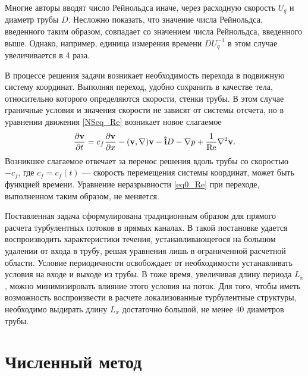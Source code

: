 Многие авторы вводят число Рейнольдса иначе, через расходную скорость $U_q$ и диаметр трубы $D$. Несложно показать, что значение числа Рейнольдса, введенного таким образом, совпадает со значением числа Рейнольдса, введенного выше. Однако, например, единица измерения времени $DU_q^{-1}$ в этом случае увеличивается в 4 раза.

В процессе решения задачи возникает необходимость перехода в подвижную систему координат. Выполняя переход, удобно сохранить в качестве тела, относительно которого определяются скорости, стенки трубы. В этом случае граничные условия и значения скорости не зависят от системы отсчета, но в уравнении движения \eqref{NSeq_Re} возникает новое слагаемое
\begin{equation}\label{NSeq_cf}
\frac{\partial \mathbf{v}}{\partial t} = c_f \frac{\partial \mathbf{v}}{\partial x} - (\mathbf{v}, \nabla) \mathbf{v} - \mathbf{\hat{i}} D - \nabla p + \frac{1}{\operatorname{Re}} \nabla^2 \mathbf{v}. 
\end{equation}
Возникшее слагаемое отвечает за перенос решения вдоль трубы со скоростью $-c_f$, где $c_f = c_f(t)$ --- скорость перемещения системы координат, может быть функцией времени. Уравнение неразрывности \eqref{eq0_Re} при переходе, выполненном таким образом, не меняется. 


Поставленная задача сформулирована традиционным образом для прямого расчета турбулентных потоков в прямых каналах. В такой постановке удается воспроизводить характеристики течения, устанавливающегося на большом удалении от входа в трубу, решая уравнения лишь в ограниченной расчетной области. Условие периодичности освобождает от необходимости устанавливать условия на входе и выходе из трубы. В тоже время, увеличивая длину периода $L_x$, можно минимизировать влияние этого условия на поток. Для того, чтобы иметь возможность воспроизвести в расчете локализованные турбулентные структуры, необходимо выдирать длину $L_x$ достаточно большой, не менее $40$ диаметров трубы. 


\section{Численный метод}

\begin{comment}
Поставленная задача решается численно конечно-разностным методом \cite{nikitin2006method}. Метод формулируется относительно уравнения движения \eqref{NSeq_Re}, преобразованного к виду 
\begin{equation}\label{NSeq_om}
\pd{\v}{t} = - \i D + \v \times \om - \nabla P - \frac{1}{\Re} \rot \om
\end{equation}
Здесь $\om = \rot \v$ --- вектор завихренности, посчитанный по полю скорости $\v$, $P = p + |\v|^2/2$ --- полное кинематическое давление. Эквивалентность уравнений \eqref{NSeq_Re} и \eqref{NSeq_om} следует из векторных тождеств
\begin{equation*}
-(\v, \nabla) \v = \v \times \rot \v - \nabla |\v|^2/2,
\end{equation*}
\begin{equation*}
\nabla^2 \v = \grad \div \v - \rot \rot \v.
\end{equation*}
\end{comment}

